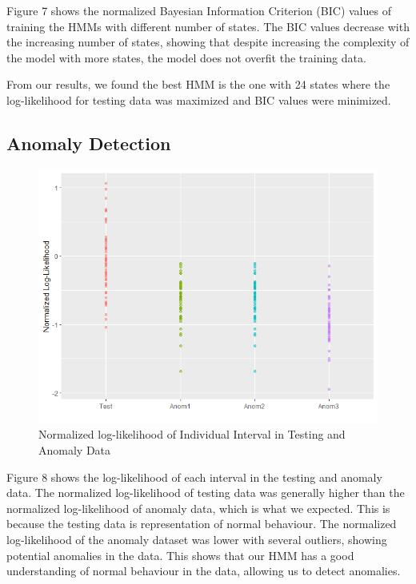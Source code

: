 \documentclass[11pt]{article}
\begin{document}
Figure 7 shows the normalized Bayesian Information Criterion (BIC) values of 
training the HMMs with different number of states.
The BIC values decrease with the increasing number of states, showing that 
despite increasing the complexity of the model with more states, the model does 
not overfit the training data.

From our results, we found the best HMM is the one with 24 states where the 
log-likelihood for testing data was maximized and BIC values were minimized.

\subsection{Anomaly Detection}

\begin{figure}[H]
  \centering
  \includegraphics[scale=0.7]{../images/IndividualLogLike.png}
  \caption{Normalized log-likelihood of Individual Interval in Testing and Anomaly Data}
\end{figure}

Figure 8 shows the log-likelihood of each interval in the testing and anomaly data. 
The normalized log-likelihood of testing data was generally higher than the 
normalized log-likelihood of anomaly data, which is what we expected. 
This is because the testing data is representation of normal behaviour. 
The normalized log-likelihood of the anomaly dataset was lower with several 
outliers, showing potential anomalies in the data. 
This shows that our HMM has a good understanding of normal behaviour in the data,
allowing us to detect anomalies.
\end{document}

